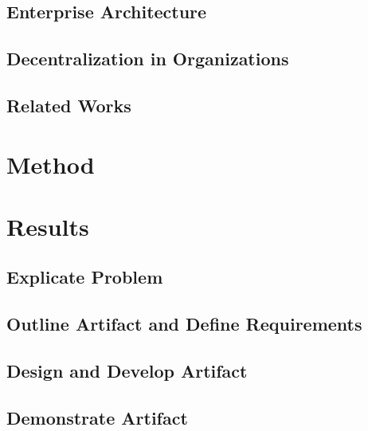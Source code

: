 \documentclass[12pt,
               a4,
               twoside,
               openright]{book} %
\begin{document}
    \section{Enterprise Architecture}
    \label{sec:ea}
    
    
    \section{Decentralization in Organizations}
    \label{sec:organizations}
       
    
    \section{Related Works}
    \label{sec:related}
    
    
    
    \chapter{Method}
    \label{chap:method}
    
    
    
    \chapter{Results}
    \label{chap:results}  
    
    \section{Explicate Problem}    
    \label{sec:exproblem}
    
    
    \section{Outline Artifact and Define Requirements}
    \label{sec:outline}
        
    
    \section{Design and Develop Artifact}
    \label{sec:design}
    
    
    \section{Demonstrate Artifact}
    \label{sec:demo}
    
    
\end{document}
